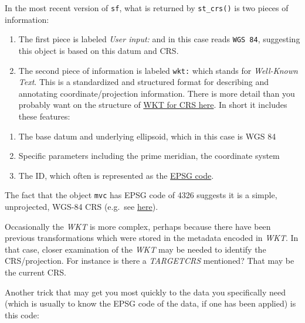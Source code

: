 \documentclass[
]{book}
\newenvironment{Shaded}{\begin{snugshade}}{\end{snugshade}}
\newcommand{\CommentTok}[1]{\textcolor[rgb]{0.56,0.35,0.01}{\textit{#1}}}
\newcommand{\FunctionTok}[1]{\textcolor[rgb]{0.13,0.29,0.53}{\textbf{#1}}}
\newcommand{\NormalTok}[1]{#1}
\newcommand{\SpecialCharTok}[1]{\textcolor[rgb]{0.81,0.36,0.00}{\textbf{#1}}}
\providecommand{\tightlist}{%
  \setlength{\itemsep}{0pt}\setlength{\parskip}{0pt}}
\begin{document}
In the most recent version of \texttt{sf}, what is returned by \texttt{st\_crs()} is two pieces of information:

\begin{enumerate}
\def\labelenumi{\arabic{enumi}.}
\tightlist
\item
  The first piece is labeled \emph{User input:} and in this case reads \texttt{WGS\ 84}, suggesting this object is based on this datum and CRS.
\item
  The second piece of information is labeled \texttt{wkt:} which stands for \emph{Well-Known Text}. This is a standardized and structured format for describing and annotating coordinate/projection information. There is more detail than you probably want on the structure of \href{http://docs.opengeospatial.org/is/12-063r5/12-063r5.html\#43}{WKT for CRS here}. In short it includes these features:
\end{enumerate}

\begin{enumerate}
\def\labelenumi{\alph{enumi}.}
\tightlist
\item
  The base datum and underlying ellipsoid, which in this case is WGS 84
\item
  Specific parameters including the prime meridian, the coordinate system
\item
  The ID, which often is represented as the \href{https://epsg.io/}{EPSG code}.
\end{enumerate}

The fact that the object \texttt{mvc} has EPSG code of 4326 suggests it is a simple, unprojected, WGS-84 CRS (e.g.~see \href{https://epsg.io/?q=4326}{here}).

Occasionally the \emph{WKT} is more complex, perhaps because there have been previous transformations which were stored in the metadata encoded in \emph{WKT}. In that case, closer examination of the \emph{WKT} may be needed to identify the CRS/projection. For instance is there a \emph{TARGETCRS} mentioned? That may be the current CRS.

Another trick that may get you most quickly to the data you specifically need (which is usually to know the EPSG code of the data, if one has been applied) is this code:

\begin{Shaded}
\end{Shaded}
\end{document}
